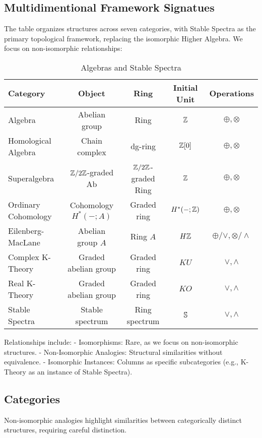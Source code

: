 \documentclass{article}
\theoremstyle{plain}
\theoremstyle{definition}
\begin{document}
\subsection{Multidimentional Framework Signatues}

The table organizes structures across seven categories, with Stable Spectra as the primary topological framework, replacing the isomorphic Higher Algebra. We focus on non-isomorphic relationships:

\begin{table}[h]
\centering
\caption{Algebras and Stable Spectra}
\begin{tabular}{l|c|c|c|c}
\toprule
Category & Object & Ring & Initial Unit & Operations \\
\midrule
Algebra & Abelian group & Ring & \(\mathbb{Z}\) & \(\oplus, \otimes\) \\
Homological Algebra & Chain complex & dg-ring & \(\mathbb{Z}[0]\) & \(\oplus, \otimes\) \\
Superalgebra & \(\mathbb{Z}/2\mathbb{Z}\)-graded Ab & \(\mathbb{Z}/2\mathbb{Z}\)-graded Ring & \(\mathbb{Z}\) & \(\oplus, \otimes\) \\
Ordinary Cohomology & Cohomology \(H^*(-; A)\) & Graded ring & \(H^*(-; \mathbb{Z})\) & \(\oplus, \otimes\) \\
\hline
Eilenberg-MacLane & Abelian group \(A\) & Ring \(A\) & \(H\mathbb{Z}\) & \(\oplus/\vee, \otimes/\wedge\) \\
Complex K-Theory & Graded abelian group & Graded ring & \(KU\) & \(\vee, \wedge\) \\
Real K-Theory & Graded abelian group & Graded ring & \(KO\) & \(\vee, \wedge\) \\
Stable Spectra & Stable spectrum & Ring spectrum & \(\mathbb{S}\) & \(\vee, \wedge\) \\
\bottomrule
\end{tabular}
\end{table}

Relationships include:
- Isomorphisms: Rare, as we focus on non-isomorphic structures.
- Non-Isomorphic Analogies: Structural similarities without equivalence.
- Isomorphic Instances: Columns as specific subcategories (e.g., K-Theory as an instance of Stable Spectra).

\subsection{Categories}

Non-isomorphic analogies highlight similarities between categorically
distinct structures, requiring careful distinction.
\end{document}

